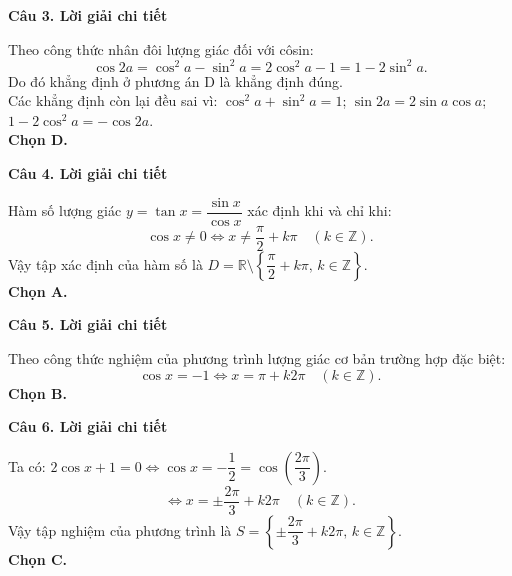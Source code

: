 \documentclass[12pt, a4paper]{article}
\begin{document}
\noindent\textbf{Câu 3. Lời giải chi tiết}\par
\begin{tcolorbox}[enhanced,breakable,colback=solutionbg,colframe=secondary!50!black,frame hidden,borderline west={3pt}{0pt}{secondary!50!black}]
Theo công thức nhân đôi lượng giác đối với côsin:
$$\cos 2a = \cos^2 a - \sin^2 a = 2\cos^2 a - 1 = 1 - 2\sin^2 a.$$
Do đó khẳng định ở phương án D là khẳng định đúng.\\
Các khẳng định còn lại đều sai vì: $\cos^2 a + \sin^2 a = 1$; $\sin 2a = 2\sin a\cos a$; $1 - 2\cos^2 a = -\cos 2a$.\\
\textbf{Chọn D.}
\end{tcolorbox}

\noindent\textbf{Câu 4. Lời giải chi tiết}\par
\begin{tcolorbox}[enhanced,breakable,colback=solutionbg,colframe=secondary!50!black,frame hidden,borderline west={3pt}{0pt}{secondary!50!black}]
Hàm số lượng giác $y = \tan x = \dfrac{\sin x}{\cos x}$ xác định khi và chỉ khi:
$$\cos x \ne 0 \Leftrightarrow x \ne \dfrac{\pi}{2} + k\pi\quad (k\in\mathbb{Z}).$$
Vậy tập xác định của hàm số là $D = \mathbb{R}\setminus\left\{\dfrac{\pi}{2} + k\pi,\, k\in\mathbb{Z}\right\}$.\\
\textbf{Chọn A.}
\end{tcolorbox}

\noindent\textbf{Câu 5. Lời giải chi tiết}\par
\begin{tcolorbox}[enhanced,breakable,colback=solutionbg,colframe=secondary!50!black,frame hidden,borderline west={3pt}{0pt}{secondary!50!black}]
Theo công thức nghiệm của phương trình lượng giác cơ bản trường hợp đặc biệt:
$$\cos x = -1 \Leftrightarrow x = \pi + k2\pi\quad (k\in\mathbb{Z}).$$
\textbf{Chọn B.}
\end{tcolorbox}

\noindent\textbf{Câu 6. Lời giải chi tiết}\par
\begin{tcolorbox}[enhanced,breakable,colback=solutionbg,colframe=secondary!50!black,frame hidden,borderline west={3pt}{0pt}{secondary!50!black}]
Ta có: $2\cos x + 1 = 0 \Leftrightarrow \cos x = -\dfrac{1}{2} = \cos\left(\dfrac{2\pi}{3}\right)$.
$$\Leftrightarrow x = \pm\dfrac{2\pi}{3} + k2\pi\quad (k\in\mathbb{Z}).$$
Vậy tập nghiệm của phương trình là $S = \left\{\pm\dfrac{2\pi}{3} + k2\pi,\, k\in\mathbb{Z}\right\}$.\\
\textbf{Chọn C.}
\end{tcolorbox}
\end{document}
